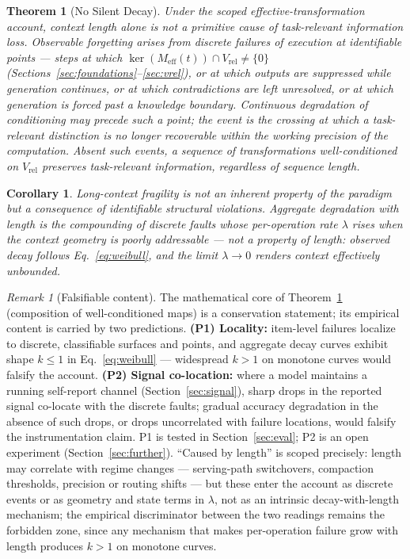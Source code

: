 \documentclass[11pt]{article}
\newtheorem{theorem}{Theorem}
\newtheorem{corollary}{Corollary}
\theoremstyle{remark}
\newtheorem{remark}{Remark}
\newcommand{\Vrel}{V_{\mathrm{rel}}}
\newcommand{\Meff}{M_{\mathrm{eff}}}
\begin{document}
\begin{theorem}[No Silent Decay]
\label{thm:nosilentdecay}
Under the scoped effective-transformation account, context length alone is not
a primitive cause of task-relevant information loss. Observable forgetting
arises from discrete failures of execution at identifiable points --- steps at
which $\ker(\Meff(t)) \cap \Vrel \neq \{0\}$
(Sections~\ref{sec:foundations}--\ref{sec:vrel}), or at which outputs are
suppressed while generation continues, or at which contradictions are left
unresolved, or at which generation is forced past a knowledge boundary.
Continuous degradation of conditioning may precede such a point; the event is
the crossing at which a task-relevant distinction is no longer recoverable
within the working precision of the computation. Absent such events, a
sequence of transformations well-conditioned on $\Vrel$ preserves
task-relevant information, regardless of sequence length.
\end{theorem}

\begin{corollary}
Long-context fragility is not an inherent property of the paradigm but a consequence
of identifiable structural violations. Aggregate degradation with length is the
compounding of discrete faults whose per-operation rate $\lambda$ rises when the
context geometry is poorly addressable --- not a property of length: observed decay
follows Eq.~\eqref{eq:weibull}, and the limit $\lambda \to 0$ renders context
effectively unbounded.
\end{corollary}

\begin{remark}[Falsifiable content]
\label{rem:falsifier}
The mathematical core of Theorem~\ref{thm:nosilentdecay} (composition of
well-conditioned maps) is a conservation statement; its empirical content is carried
by two predictions. \textbf{(P1) Locality:} item-level failures localize to discrete,
classifiable surfaces and points, and aggregate decay curves exhibit shape
$k \le 1$ in Eq.~\eqref{eq:weibull} --- widespread $k > 1$ on monotone curves would
falsify the account. \textbf{(P2) Signal co-location:} where a model maintains a
running self-report channel (Section~\ref{sec:signal}), sharp drops in the reported
signal co-locate with the discrete faults; gradual accuracy degradation in the absence
of such drops, or drops uncorrelated with failure locations, would falsify the
instrumentation claim. P1 is tested in Section~\ref{sec:eval}; P2 is an open
experiment (Section~\ref{sec:further}). ``Caused by length'' is scoped
precisely: length may correlate with regime changes --- serving-path
switchovers, compaction thresholds, precision or routing shifts --- but these
enter the account as discrete events or as geometry and state terms in
$\lambda$, not as an intrinsic decay-with-length mechanism; the empirical
discriminator between the two readings remains the forbidden zone, since any
mechanism that makes per-operation failure grow with length produces $k > 1$
on monotone curves.
\end{remark}
\end{document}
